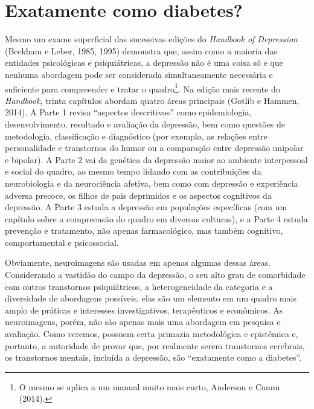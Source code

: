 \section{Exatamente como diabetes?}

Mesmo um exame superficial das sucessivas edições do \emph{Handbook of
Depression} (Beckham e Leber, 1985, 1995) demonstra que, assim como a
maioria das entidades psicológicas e psiquiátricas, a depressão não é
uma coisa só e que nenhuma abordagem pode ser considerada
simultaneamente necessária e suficiente para compreender e tratar o
quadro\footnote[3]{O mesmo se aplica a um manual muito mais curto, Anderson e Camm
(2014).}. Na edição mais recente do \emph{Handbook},
trinta capítulos abordam quatro áreas principais (Gotlib e Hammen,
2014). A Parte 1 revisa ``aspectos descritivos'' como epidemiologia,
desenvolvimento, resultado e avaliação da depressão, bem como questões
de metodologia, classificação e diagnóstico (por exemplo, as relações
entre personalidade e transtornos do humor ou a comparação entre
depressão unipolar e bipolar). A Parte 2 vai da genética da depressão
maior ao ambiente interpessoal e social do quadro, ao mesmo tempo
lidando com as contribuições da neurobiologia e da neurociência afetiva,
bem como com depressão e experiência adversa precoce, os filhos de pais
deprimidos e os aspectos cognitivos da depressão. A Parte 3 estuda a
depressão em populações específicas (com um capítulo sobre a compreensão
do quadro em diversas culturas), e a Parte 4 estuda prevenção e
tratamento, não apenas farmacológico, mas também cognitivo,
comportamental e psicossocial.

Obviamente, neuroimagens são usadas em apenas algumas dessas áreas.
Considerando a vastidão do campo da depressão, o seu alto grau de
comorbidade com outros transtornos psiquiátricos, a heterogeneidade da
categoria e a diversidade de abordagens possíveis, elas são um elemento
em um quadro mais amplo de práticas e interesses investigativos,
terapêuticos e econômicos. As neuroimagens, porém, não são apenas mais
uma abordagem em pesquisa e avaliação. Como veremos, possuem certa
primazia metodológica e epistêmica e, portanto, a autoridade de provar
que, por realmente serem transtornos cerebrais, os transtornos mentais,
incluída a depressão, são ``exatamente como a diabetes''.


